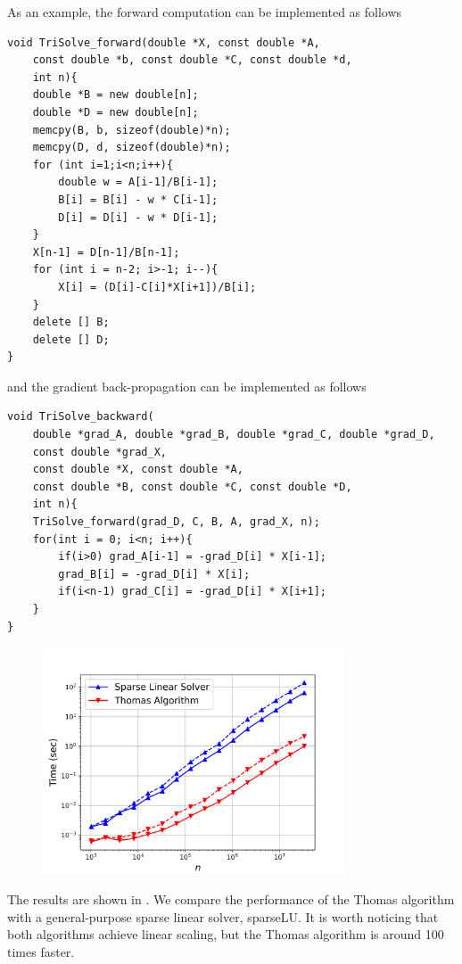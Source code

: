 \documentclass[3p,preprint,12pt]{elsarticle}
\begin{document}
As an example, the forward computation can be implemented as follows
\begin{verbatim}
void TriSolve_forward(double *X, const double *A, 
    const double *b, const double *C, const double *d,
    int n){
    double *B = new double[n]; 
    double *D = new double[n]; 
    memcpy(B, b, sizeof(double)*n);
    memcpy(D, d, sizeof(double)*n);
    for (int i=1;i<n;i++){
        double w = A[i-1]/B[i-1];
        B[i] = B[i] - w * C[i-1];
        D[i] = D[i] - w * D[i-1];
    }
    X[n-1] = D[n-1]/B[n-1];
    for (int i = n-2; i>-1; i--){
        X[i] = (D[i]-C[i]*X[i+1])/B[i];
    }
    delete [] B;
    delete [] D;
}
\end{verbatim}
and the gradient back-propagation can be implemented as follows
\begin{verbatim}
void TriSolve_backward(
    double *grad_A, double *grad_B, double *grad_C, double *grad_D,
    const double *grad_X,
    const double *X, const double *A, 
    const double *B, const double *C, const double *D,
    int n){
    TriSolve_forward(grad_D, C, B, A, grad_X, n);  
    for(int i = 0; i<n; i++){
        if(i>0) grad_A[i-1] = -grad_D[i] * X[i-1];
        grad_B[i] = -grad_D[i] * X[i];
        if(i<n-1) grad_C[i] = -grad_D[i] * X[i+1];
    }
}
\end{verbatim}

\begin{figure}[htpb]
    \centering
    \includegraphics[width=0.8\textwidth]{paper/Kailai/figures/trisolve.png}
    \caption{}
    \label{fig:trisolve}
\end{figure}

The results are shown in . We compare the performance of the Thomas algorithm with a general-purpose sparse linear solver, sparseLU. It is worth noticing that both algorithms achieve linear scaling, but the Thomas algorithm is around 100 times faster. 
\end{document}
